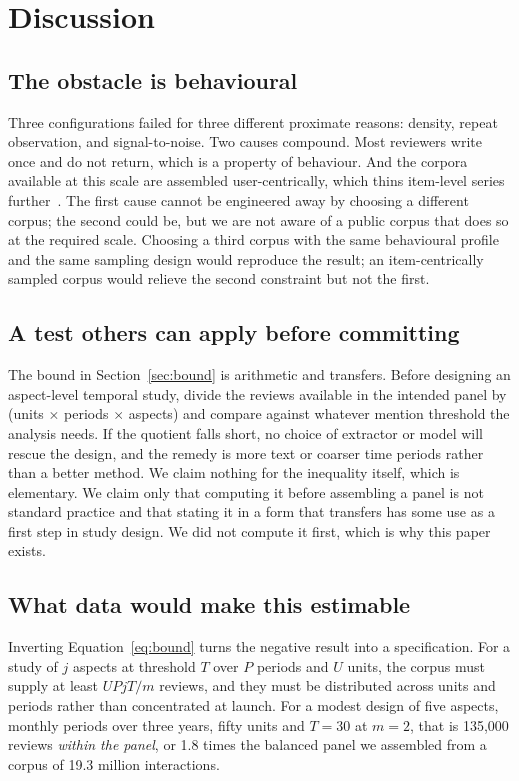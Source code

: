 \documentclass[11pt,a4paper]{article}
\makeatletter
\let\original@section\section
\renewcommand{\section}{\FloatBarrier\original@section}%
\let\original@subsection\subsection
\renewcommand{\subsection}{\FloatBarrier\original@subsection}%
\makeatother
\begin{document}
\section{Discussion}

\subsection{The obstacle is behavioural}

Three configurations failed for three different proximate reasons: density,
repeat observation, and signal-to-noise. Two causes compound. Most reviewers
write once and do not return, which is a property of behaviour. And the
corpora available at this scale are assembled user-centrically, which thins
item-level series further~\citep{hou2026}. The first cause cannot be
engineered away by choosing a different corpus; the second could be, but we
are not aware of a public corpus that does so at the required scale. Choosing a
third corpus with the same behavioural profile and the same sampling design
would reproduce the result; an item-centrically sampled corpus would relieve
the second constraint but not the first.

\subsection{A test others can apply before committing}

The bound in Section~\ref{sec:bound} is arithmetic and transfers. Before
designing an aspect-level temporal study, divide the reviews available in the
intended panel by (units $\times$ periods $\times$ aspects) and compare against
whatever mention threshold the analysis needs. If the quotient falls short, no
choice of extractor or model will rescue the design, and the remedy is more
text or coarser time periods rather than a better method. We claim nothing for the
inequality itself, which is elementary. We claim only that computing it before
assembling a panel is not standard practice and that stating it in a form that
transfers has some use as a first step in study design. We did not compute it
first, which is why this paper exists.

\subsection{What data would make this estimable}
\label{sec:whatdata}

Inverting Equation~\ref{eq:bound} turns the negative result into a
specification. For a study of $j$ aspects at threshold $T$ over $P$ periods and
$U$ units, the corpus must supply at least $UPjT/m$ reviews, and they must be
distributed across units and periods rather than concentrated at launch. For a
modest design of five aspects, monthly periods over three years, fifty units
and $T = 30$ at $m = 2$, that is 135{,}000 reviews \emph{within the panel},
or 1.8 times the balanced panel we assembled from a corpus of 19.3 million
interactions.
\end{document}
